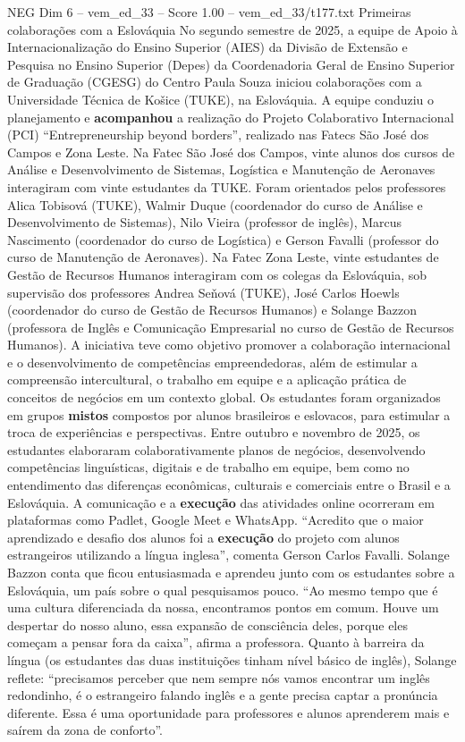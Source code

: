 \begin{textsample}{NEG Dim 6 – vem\_ed\_33 – Score 1.00 – vem\_ed\_33/t177.txt}  \label{ex:f6_neg_092}
Primeiras colaborações com a Eslováquia No segundo semestre de 2025, a equipe de Apoio à Internacionalização do Ensino Superior (AIES) da Divisão de Extensão e Pesquisa no Ensino Superior (Depes) da Coordenadoria Geral de Ensino Superior de Graduação (CGESG) do Centro Paula Souza iniciou colaborações com a Universidade Técnica de Košice (TUKE), na Eslováquia.
A equipe conduziu o planejamento e \textbf{acompanhou} a realização do Projeto Colaborativo Internacional (PCI) “Entrepreneurship beyond borders”, realizado nas Fatecs São José dos Campos e Zona Leste.
Na Fatec São José dos Campos, vinte alunos dos cursos de Análise e Desenvolvimento de Sistemas, Logística e Manutenção de Aeronaves interagiram com vinte estudantes da TUKE.
Foram orientados pelos professores Alica Tobisová (TUKE), Walmir Duque (coordenador do curso de Análise e Desenvolvimento de Sistemas), Nilo Vieira (professor de inglês), Marcus Nascimento (coordenador do curso de Logística) e Gerson Favalli (professor do curso de Manutenção de Aeronaves).
Na Fatec Zona Leste, vinte estudantes de Gestão de Recursos Humanos interagiram com os colegas da Eslováquia, sob supervisão dos professores Andrea Seňová (TUKE), José Carlos Hoewls (coordenador do curso de Gestão de Recursos Humanos) e Solange Bazzon (professora de Inglês e Comunicação Empresarial no curso de Gestão de Recursos Humanos).
A iniciativa teve como objetivo promover a colaboração internacional e o desenvolvimento de competências empreendedoras, além de estimular a compreensão intercultural, o trabalho em equipe e a aplicação prática de conceitos de negócios em um contexto global.
Os estudantes foram organizados em grupos \textbf{mistos} compostos por alunos brasileiros e eslovacos, para estimular a troca de experiências e perspectivas.
Entre outubro e novembro de 2025, os estudantes elaboraram colaborativamente planos de negócios, desenvolvendo competências linguísticas, digitais e de trabalho em equipe, bem como no entendimento das diferenças econômicas, culturais e comerciais entre o Brasil e a Eslováquia.
A comunicação e a \textbf{execução} das atividades online ocorreram em plataformas como Padlet, Google Meet e WhatsApp. “Acredito que o maior aprendizado e desafio dos alunos foi a \textbf{execução} do projeto com alunos estrangeiros utilizando a língua inglesa”, comenta Gerson Carlos Favalli.
Solange Bazzon conta que ficou entusiasmada e aprendeu junto com os estudantes sobre a Eslováquia, um país sobre o qual pesquisamos pouco. “Ao mesmo tempo que é uma cultura diferenciada da nossa, encontramos pontos em comum.
Houve um despertar do nosso aluno, essa expansão de consciência deles, porque eles começam a pensar fora da caixa”, afirma a professora.
Quanto à barreira da língua (os estudantes das duas instituições tinham nível básico de inglês), Solange reflete: “precisamos perceber que nem sempre nós vamos encontrar um inglês redondinho, é o estrangeiro falando inglês e a gente precisa captar a pronúncia diferente.
Essa é uma oportunidade para professores e alunos aprenderem mais e saírem da zona de conforto”.

\end{textsample}
